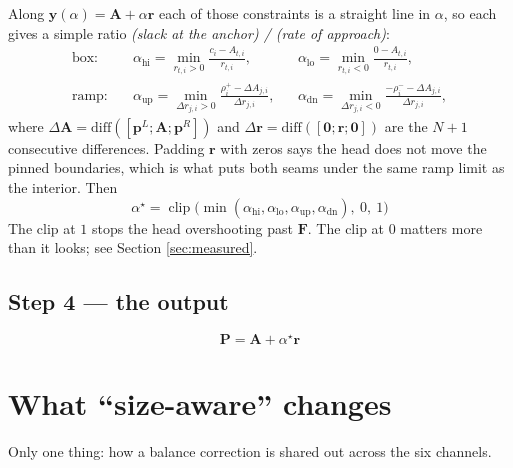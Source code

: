\documentclass[11pt]{article}
\begin{document}
Along $\mathbf{y}(\alpha)=\mathbf{A}+\alpha\mathbf{r}$ each of those constraints
is a straight line in $\alpha$, so each gives a simple ratio
\emph{(slack at the anchor) / (rate of approach)}:
\begin{align}
\text{box:}\quad
&\alpha_{\mathrm{hi}}=\min_{r_{t,i}>0}\frac{c_i-A_{t,i}}{r_{t,i}},
&&\alpha_{\mathrm{lo}}=\min_{r_{t,i}<0}\frac{0-A_{t,i}}{r_{t,i}},
\label{eq:wall-box}\\[3pt]
\text{ramp:}\quad
&\alpha_{\mathrm{up}}=\min_{\Delta r_{j,i}>0}\frac{\rho^{+}_i-\Delta A_{j,i}}{\Delta r_{j,i}},
&&\alpha_{\mathrm{dn}}=\min_{\Delta r_{j,i}<0}\frac{-\rho^{-}_i-\Delta A_{j,i}}{\Delta r_{j,i}},
\label{eq:wall-ramp}
\end{align}
where $\Delta\mathbf{A}=\mathrm{diff}([\mathbf{p}^{L};\mathbf{A};\mathbf{p}^{R}])$
and $\Delta\mathbf{r}=\mathrm{diff}([\mathbf{0};\mathbf{r};\mathbf{0}])$ are the
$N{+}1$ consecutive differences. Padding $\mathbf{r}$ with zeros says the head
does not move the pinned boundaries, which is what puts both seams under the
same ramp limit as the interior. Then
\begin{equation}
\boxed{\ \alpha^{\star}=\operatorname{clip}\bigl(\min(\alpha_{\mathrm{hi}},\alpha_{\mathrm{lo}},\alpha_{\mathrm{up}},\alpha_{\mathrm{dn}}),\ 0,\ 1\bigr)\ }
\end{equation}
The clip at $1$ stops the head overshooting past $\mathbf{F}$. The clip at $0$
matters more than it looks; see Section \ref{sec:measured}.

\subsection*{Step 4 --- the output}
\begin{equation}
\boxed{\ \mathbf{P}=\mathbf{A}+\alpha^{\star}\mathbf{r}\ }
\end{equation}

\section{What ``size-aware'' changes}
\label{sec:sizeaware}

Only one thing: how a balance correction is shared out across the six channels.
\end{document}
